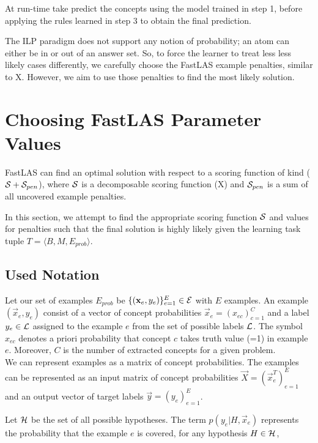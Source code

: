At run-time take predict the concepts using the model trained in step 1, before applying the rules learned in step 3 to obtain the final prediction.

The ILP paradigm does not support any notion of probability; an atom can either be in or out of an answer set. 
So, to force the learner to treat less less likely cases differently, we carefully choose the FastLAS example penalties, similar to X.
However, we aim to use those penalties to find the most likely solution.

\section{Choosing FastLAS Parameter Values}
\label{choosing-fastlas-parameter-values}

FastLAS can find an optimal solution with respect to a scoring function of kind ($\mathcal{S} + \mathcal{S}_{pen}$), where $\mathcal{S}$ is a decomposable scoring function (X) and $\mathcal{S}_{pen}$ is a sum of all uncovered example penalties.

In this section, we attempt to find the appropriate scoring function $\mathcal{S}$ and values for penalties such that the final solution is highly likely given the learning task tuple $T = \langle B, M, E_{prob} \rangle$. 

\subsection{Used Notation}

Let our set of examples $E_{prob}$ be $\{(\textbf{x}_e, y_e)\}_{e=1}^{E} \in \mathcal{E}$ with $E$ examples. 
An example $(\vec{x}_e, y_e)$ consist of a vector of concept probabilities $\vec{x}_e = (x_{ec})_{c=1}^C$ and a label $y_e \in \mathcal{L}$ assigned to the example $e$ from the set of possible labels $\mathcal{L}$.
The symbol $x_{ec}$ denotes a priori probability that concept $c$ takes truth value (=1) in example $e$.
Moreover, $C$ is the number of extracted concepts for a given problem. \\
We can represent examples as a matrix of concept probabilities.  
The examples can be represented as an input matrix of concept probabilities $\vec{X} = (\vec{x}_e^T)_{e=1}^E$ and an output vector of target labels $\vec{y} = (y_e)_{e=1}^E$.

Let $\mathcal{H}$ be the set of all possible hypotheses. The term $p(y_e|H, \vec{x}_{e})$ represents the probability that the example $e$ is covered, for any hypothesis $H \in \mathcal{H}$,



